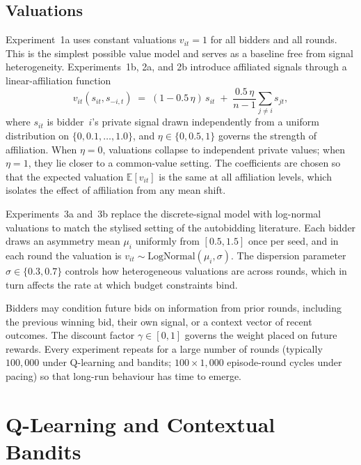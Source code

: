 \subsection{Valuations}

Experiment~1a uses constant valuations $v_{it} = 1$ for all bidders and all rounds. This is the simplest possible value model and serves as a baseline free from signal heterogeneity. Experiments~1b, 2a, and 2b introduce affiliated signals through a linear-affiliation function
\[
v_{it}(s_{it}, s_{-i,t}) \;=\; (1 - 0.5\,\eta)\,s_{it} \;+\; \frac{0.5\,\eta}{n-1}\sum_{j \neq i} s_{jt},
\]
where $s_{it}$ is bidder~$i$'s private signal drawn independently from a uniform distribution on $\{0, 0.1, \ldots, 1.0\}$, and $\eta \in \{0, 0.5, 1\}$ governs the strength of affiliation. When $\eta = 0$, valuations collapse to independent private values; when $\eta = 1$, they lie closer to a common-value setting. The coefficients are chosen so that the expected valuation $\mathbb{E}[v_{it}]$ is the same at all affiliation levels, which isolates the effect of affiliation from any mean shift.

Experiments~3a and~3b replace the discrete-signal model with log-normal valuations to match the stylised setting of the autobidding literature. Each bidder draws an asymmetry mean $\mu_i$ uniformly from $[0.5, 1.5]$ once per seed, and in each round the valuation is $v_{it} \sim \mathrm{LogNormal}(\mu_i, \sigma)$. The dispersion parameter $\sigma \in \{0.3, 0.7\}$ controls how heterogeneous valuations are across rounds, which in turn affects the rate at which budget constraints bind.

Bidders may condition future bids on information from prior rounds, including the previous winning bid, their own signal, or a context vector of recent outcomes. The discount factor $\gamma \in [0, 1]$ governs the weight placed on future rewards. Every experiment repeats for a large number of rounds (typically $100{,}000$ under Q-learning and bandits; $100 \times 1{,}000$ episode-round cycles under pacing) so that long-run behaviour has time to emerge.

\section{Q-Learning and Contextual Bandits}
\label{sec:qlearning}

